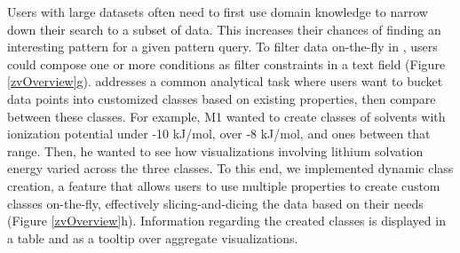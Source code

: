  Users with large datasets often need to first use domain knowledge to narrow down their search to a subset of data. This increases their chances of finding an interesting pattern for a given pattern query. To filter data on-the-fly in \zv, users could compose one or more conditions as filter constraints in a text field (Figure \ref{zvOverview}g). 
 addresses a common analytical task where users want to bucket data points into customized classes based on existing properties, then compare between these classes. For example, M1 wanted to create classes of solvents with ionization potential under -10 kJ/mol, over -8 kJ/mol, and ones between that range. Then, he wanted to see how visualizations involving lithium solvation energy varied across the three classes. To this end, we implemented dynamic class creation, a feature that allows users to use multiple properties to create custom classes on-the-fly, effectively slicing-and-dicing the data based on their needs (Figure \ref{zvOverview}h). Information regarding the created classes is displayed in a table and as a tooltip over aggregate visualizations.
